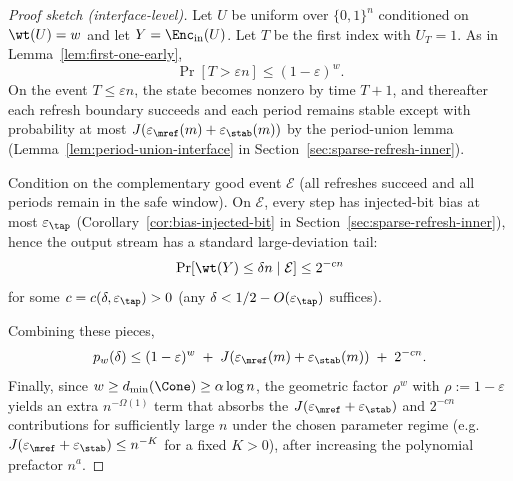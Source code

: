 \begin{proof}[Proof sketch (interface-level)]
Let $U$ be uniform over $\{0,1\}^n$ conditioned on $\wt(U)=w$ and let $Y=\Enc_{\mathrm{in}}(U)$.
Let $T$ be the first index with $U_T=1$. As in Lemma~\ref{lem:first-one-early},
\[
\Pr[T>\varepsilon n]\le (1-\varepsilon)^w.
\]
On the event $T\le \varepsilon n$, the state becomes nonzero by time $T+1$, and thereafter each refresh boundary succeeds and each
period remains stable except with probability at most $J(\varepsilon_{\mref}(m)+\varepsilon_{\stab}(m))$ by the period-union lemma
(Lemma~\ref{lem:period-union-interface} in Section~\ref{sec:sparse-refresh-inner}).

Condition on the complementary good event $\mathcal{E}$ (all refreshes succeed and all periods remain in the safe window).
On $\mathcal{E}$, every step has injected-bit bias at most $\varepsilon_{\tap}$ (Corollary~\ref{cor:bias-injected-bit} in
Section~\ref{sec:sparse-refresh-inner}), hence the output stream has a standard large-deviation tail:
\[
\Pr[\wt(Y)\le \delta n \mid \mathcal{E}] \le 2^{-c n}
\]
for some $c=c(\delta,\varepsilon_{\tap})>0$ (any $\delta < 1/2 - O(\varepsilon_{\tap})$ suffices).

Combining these pieces,
\[
p_w(\delta)
\le
(1-\varepsilon)^w \;+\; J(\varepsilon_{\mref}(m)+\varepsilon_{\stab}(m)) \;+\; 2^{-c n}.
\]
Finally, since $w\ge d_{\min}(\Cone)\ge \alpha\log n$, the geometric factor $\rho^w$ with $\rho:=1-\varepsilon$ yields an extra
$n^{-\Omega(1)}$ term that absorbs the $J(\varepsilon_{\mref}+\varepsilon_{\stab})$ and $2^{-cn}$ contributions for sufficiently large $n$
under the chosen parameter regime (e.g.\ $J(\varepsilon_{\mref}+\varepsilon_{\stab})\le n^{-K}$ for a fixed $K>0$),
after increasing the polynomial prefactor $n^a$.
\end{proof}
